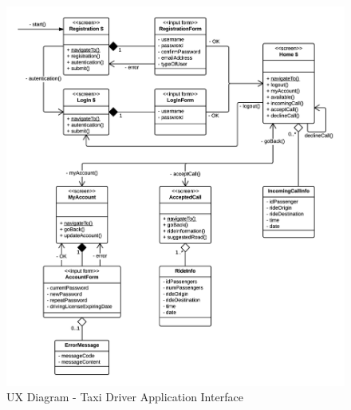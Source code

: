 \begin{figure}[htbp]
\centering
\includegraphics[width=\textwidth]{cpt/img/UXTaxiDriverApp}
\caption{UX Diagram - Taxi Driver Application Interface}
\end{figure}
\clearpage